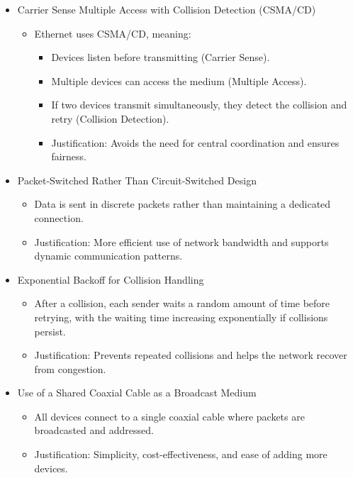 \documentclass[a4paper]{article}
\begin{document}
\begin{Solution}
\begin{itemize}
    \item Carrier Sense Multiple Access with Collision Detection (CSMA/CD)
    \begin{itemize}
        \item Ethernet uses CSMA/CD, meaning:
        \begin{itemize}
            \item Devices listen before transmitting (Carrier Sense).
            \item Multiple devices can access the medium (Multiple Access).
            \item If two devices transmit simultaneously, they detect the collision and retry (Collision Detection).
            \item Justification: Avoids the need for central coordination and ensures fairness.
        \end{itemize}
    \end{itemize}
    \item Packet-Switched Rather Than Circuit-Switched Design
    \begin{itemize}
        \item Data is sent in discrete packets rather than maintaining a dedicated connection.
        \item Justification: More efficient use of network bandwidth and supports dynamic communication patterns. 
    \end{itemize}
    \item Exponential Backoff for Collision Handling
    \begin{itemize}
        \item After a collision, each sender waits a random amount of time before retrying, with the waiting time increasing exponentially if collisions persist.
        \item Justification: Prevents repeated collisions and helps the network recover from congestion.
    \end{itemize}
    \item Use of a Shared Coaxial Cable as a Broadcast Medium
    \begin{itemize}
        \item All devices connect to a single coaxial cable where packets are broadcasted and addressed.
        \item Justification: Simplicity, cost-effectiveness, and ease of adding more devices.
    \end{itemize}
\end{itemize}
\end{Solution}
\end{document}
